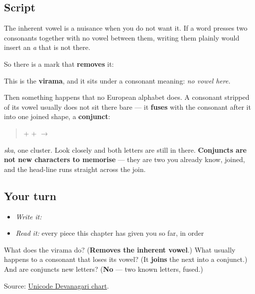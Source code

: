 \subsection*{Script}
The inherent vowel is a nuisance when you do not want it. If a word presses two consonants together with no vowel between them, writing them plainly would insert an \emph{a} that is not there.

So there is a mark that \textbf{removes} it:

\begin{quote}
\end{quote}

This is the \textbf{virama}, and it sits under a consonant meaning: \emph{no vowel here.}

Then something happens that no European alphabet does. A consonant stripped of its vowel usually does not sit there bare — it \textbf{fuses} with the consonant after it into one joined shape, a \textbf{conjunct}:

\begin{quote}
\textbf{} + \textbf{} + \textbf{} $\to$ \textbf{}
\end{quote}

\emph{ska}, one cluster. Look closely and both letters are still in there. \textbf{Conjuncts are not new characters to memorise} — they are two you already know, joined, and the head-line runs straight across the join.

\subsection*{Your turn}
\begin{itemize}
\raggedright
  \item \emph{Write it:} 
  \item \emph{Read it:} every piece this chapter has given you so far, in order
\end{itemize}

\begin{tcolorbox}[breakable,colback=teal!4,colframe=teal!35!black,title={Before you move on}]
What does the virama do? (\textbf{Removes the inherent vowel}.) What usually happens to a consonant that loses its vowel? (It \textbf{joins} the next into a conjunct.) And are conjuncts new letters? (\textbf{No} — two known letters, fused.)

Source: \href{https://www.unicode.org/charts/PDF/U0900.pdf}{Unicode Devanagari chart}.
\end{tcolorbox}
